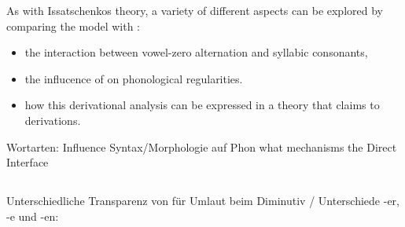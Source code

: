 As with Issatschenkos theory, a variety of different aspects
can be explored by comparing the \CVCV model with
\cite{hohleVater1978}:
\begin{itemize}
  \item the interaction between vowel-zero alternation and syllabic consonants,
  \item the influcence of  on phonological regularities.
  \item how this derivational analysis can be expressed in a theory
    that claims to  derivations.\footnotemark
\end{itemize}

Wortarten: Influence Syntax/Morphologie auf Phon
  \to what mechanisms  the Direct Interface \cite{scheer2012}

\subsection{}
Unterschiedliche Transparenz von \textschwa{} für Umlaut
beim Diminutiv / Unterschiede -er, -e und -en:
\par {} \to{} 
\par {} \to{} 